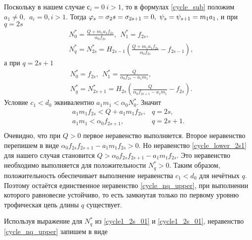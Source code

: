 Поскольку в нашем случае \(с_i = 0 ~ i > 1\), то в формулах \eqref{cycle_sub} положим \(a_1 \neq 0, ~~ a_i = 0, i>1\). Тогда \(\varphi_s = \sigma_2s = \sigma_{2s+1} = 0, ~ \psi_s = \psi_{s+1} = m_1 a_1 \), и при \(q = 2s\)
\begin{equation} \label{cycle1_2s_01}
    \begin{split}
        & N^*_0 = \frac{Q + m_1 a_1 f_{2s}}{\alpha_0 f_{2s}}, ~~ N^*_1 = f_{2s}, \\
        & N^*_q = N^*_{2s} = H_{2s-1} \left( \frac{Q + m_1 a_1 f_{2s}}{\alpha_0 f_{2s}} - f_{2s-1} \right),
    \end{split}
\end{equation}
а при \(q = 2s+1\)
\begin{equation} \label{cycle1_2s1_01}
    \begin{split}
        & N^*_0 = f_{2s}, ~~ N^*_1 = \frac{Q}{\alpha_0 f_{2s} - a_1 m_1}, \\
        & N^*_q = N^*_{2s+1} = H_{2s} \left( \frac{Q}{\alpha_0 f_{2s+1} - a_1 m_1} - f_{2s} \right).
    \end{split}
\end{equation}
Условие \( c_1 < d_0 \) эквивалентно \( a_1 m_1 < \alpha_0 N^*_0 \). Значит
\begin{equation*}
    \begin{matrix}
        a_1 m_1 f_{2s} < Q + a_1 m_1 f_{2s}, & q = 2s, \\
        a_1 m_1 < \alpha_0 f_{2s+1}, & q = 2s+1. \\
    \end{matrix}
\end{equation*}
Очевидно, что при \( Q > 0 \) первое неравенство выполняется. Второе неравенство перепишем в виде \( \alpha_0 f_{2s} f_{2s+1} - a_1 m_1 f_{2s} > 0 \). Но неравенство \eqref{cycle_lower_2s1} для нашего случая становится \( Q > \alpha_0 f_{2s} f_{2s+1} - a_1 m_1 f_{2s} \). Это неравенство необходимо выполняется для положительности \(N^*_q > 0\). Таким образом, положительность обеспечивает выполнение неравенства \(c_1 < d_0\) для нечётных \(q\). Поэтому остаётся единственное неравенство \eqref{cycle_nq_upper}, при выполнении которого равновесие устойчиво, то есть замкнутая только по первому уровню трофическая цепь длины \(q\) существует.

Используя выражение для \(N^*_q\) из \eqref{cycle1_2s_01} и \eqref{cycle1_2s_01}, неравенство \eqref{cycle_nq_upper} запишем в виде

